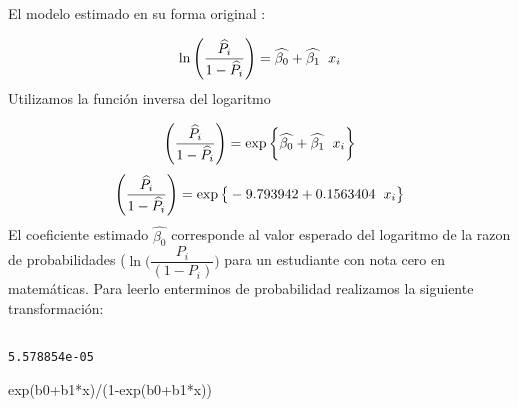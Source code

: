 \documentclass[
]{article}
\newenvironment{Shaded}{\begin{snugshade}}{\end{snugshade}}
\newcommand{\CommentTok}[1]{\textcolor[rgb]{0.56,0.35,0.01}{\textit{#1}}}
\newcommand{\DecValTok}[1]{\textcolor[rgb]{0.00,0.00,0.81}{#1}}
\newcommand{\FunctionTok}[1]{\textcolor[rgb]{0.00,0.00,0.00}{#1}}
\newcommand{\NormalTok}[1]{#1}
\newcommand{\OtherTok}[1]{\textcolor[rgb]{0.56,0.35,0.01}{#1}}
\newcommand{\SpecialCharTok}[1]{\textcolor[rgb]{0.00,0.00,0.00}{#1}}
\newcommand{\StringTok}[1]{\textcolor[rgb]{0.31,0.60,0.02}{#1}}
\begin{document}
El modelo estimado en su forma original :

\[\ln \Bigg( \dfrac{\widehat{P_{i}}}{1-\widehat{P_{i}}} \Bigg) = \widehat{\beta_{0}} + \widehat{\beta_{1}} \hspace{.2cm}x_{i}\]
Utilizamos la función inversa del logaritmo

\[\Bigg( \dfrac{\widehat{P_{i}}}{1-\widehat{P_{i}}} \Bigg) = \exp{\bigg\{ \widehat{\beta_{0}} + \widehat{\beta_{1}} \hspace{.2cm} x_{i}}\bigg\}\]
\[\Bigg( \dfrac{\widehat{P_{i}}}{1-\widehat{P_{i}}} \Bigg) = \exp{\big\{ -9.793942  + 0.1563404 \hspace{.2cm}x_{i}}\big\}\]
El coeficiente estimado \(\widehat{\beta_{0}}\) corresponde al valor
esperado del logaritmo de la razon de probabilidades
(\(\ln \Bigg(\dfrac{P_{i}}{(1-P_{i})}\Bigg)\) para un estudiante con
nota cero en matemáticas. Para leerlo enterminos de probabilidad
realizamos la siguiente transformación:

\begin{Shaded}
\end{Shaded}

\begin{verbatim}
             
5.578854e-05 
\end{verbatim}

\begin{Shaded}
\begin{Highlighting}[]
\FunctionTok{exp}\NormalTok{(b0}\SpecialCharTok{+}\NormalTok{b1}\SpecialCharTok{*}\NormalTok{x)}\SpecialCharTok{/}\NormalTok{(}\DecValTok{1}\SpecialCharTok{{-}}\FunctionTok{exp}\NormalTok{(b0}\SpecialCharTok{+}\NormalTok{b1}\SpecialCharTok{*}\NormalTok{x))}
\end{Highlighting}
\end{Shaded}
\end{document}
